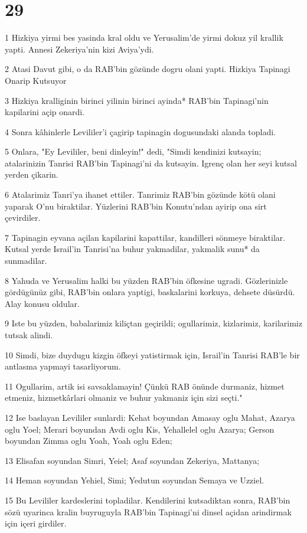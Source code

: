 \chapter{29}

\par 1 Hizkiya yirmi bes yasinda kral oldu ve Yerusalim'de yirmi dokuz yil krallik yapti. Annesi Zekeriya'nin kizi Aviya'ydi.
\par 2 Atasi Davut gibi, o da RAB'bin gözünde dogru olani yapti. Hizkiya Tapinagi Onarip Kutsuyor
\par 3 Hizkiya kralliginin birinci yilinin birinci ayinda* RAB'bin Tapinagi'nin kapilarini açip onardi.
\par 4 Sonra kâhinlerle Levililer'i çagirip tapinagin dogusundaki alanda topladi.
\par 5 Onlara, "Ey Levililer, beni dinleyin!" dedi, "Simdi kendinizi kutsayin; atalarinizin Tanrisi RAB'bin Tapinagi'ni da kutsayin. Igrenç olan her seyi kutsal yerden çikarin.
\par 6 Atalarimiz Tanri'ya ihanet ettiler. Tanrimiz RAB'bin gözünde kötü olani yaparak O'nu biraktilar. Yüzlerini RAB'bin Konutu'ndan ayirip ona sirt çevirdiler.
\par 7 Tapinagin eyvana açilan kapilarini kapattilar, kandilleri sönmeye biraktilar. Kutsal yerde Israil'in Tanrisi'na buhur yakmadilar, yakmalik sunu* da sunmadilar.
\par 8 Yahuda ve Yerusalim halki bu yüzden RAB'bin öfkesine ugradi. Gözlerinizle gördügünüz gibi, RAB'bin onlara yaptigi, baskalarini korkuya, dehsete düsürdü. Alay konusu oldular.
\par 9 Iste bu yüzden, babalarimiz kiliçtan geçirildi; ogullarimiz, kizlarimiz, karilarimiz tutsak alindi.
\par 10 Simdi, bize duydugu kizgin öfkeyi yatistirmak için, Israil'in Tanrisi RAB'le bir antlasma yapmayi tasarliyorum.
\par 11 Ogullarim, artik isi savsaklamayin! Çünkü RAB önünde durmaniz, hizmet etmeniz, hizmetkârlari olmaniz ve buhur yakmaniz için sizi seçti."
\par 12 Ise baslayan Levililer sunlardi: Kehat boyundan Amasay oglu Mahat, Azarya oglu Yoel; Merari boyundan Avdi oglu Kis, Yehallelel oglu Azarya; Gerson boyundan Zimma oglu Yoah, Yoah oglu Eden;
\par 13 Elisafan soyundan Simri, Yeiel; Asaf soyundan Zekeriya, Mattanya;
\par 14 Heman soyundan Yehiel, Simi; Yedutun soyundan Semaya ve Uzziel.
\par 15 Bu Levililer kardeslerini topladilar. Kendilerini kutsadiktan sonra, RAB'bin sözü uyarinca kralin buyruguyla RAB'bin Tapinagi'ni dinsel açidan arindirmak için içeri girdiler.
